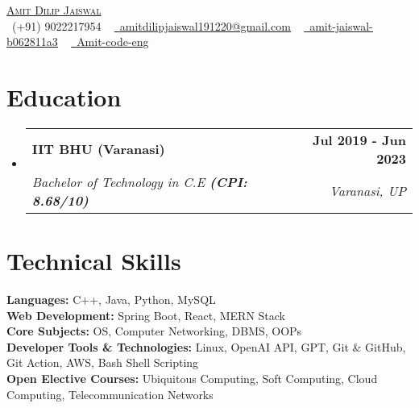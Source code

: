 \documentclass[letterpaper,11pt]{article}
\makeatletter
\newcommand{\resumeSubheading}[4]{
  \vspace{-2pt}\item
    \begin{tabular*}{1.0\textwidth}[t]{l@{\extracolsep{\fill}}r}
      \textbf{#1} & \textbf{\small #2} \\
      \textit{\small#3} & \textit{\small #4} \\
    \end{tabular*}\vspace{-7pt}
}
\newcommand{\resumeSubHeadingListStart}{\begin{itemize}[leftmargin=0.0in, label={}]}
\newcommand{\resumeSubHeadingListEnd}{\end{itemize}}
\makeatother
\begin{document}
\begin{center}
    {\Huge \scshape \href{https://amit-dilip-jaiswal.vercel.app/}{Amit Dilip Jaiswal}} \\ \vspace{3pt}
    \small \raisebox{-0.1\height}\faPhone\ {{(+91) 9022217954}} ~ \href{mailto:amitdilipjaiswal191220@gmail.com}{\raisebox{-0.2\height}\faEnvelope\  \underline{{amitdilipjaiswal191220@gmail.com}}} ~ 
    \href{https://www.linkedin.com/in/amit-jaiswal-b062811a3/}{\raisebox{-0.2\height}\faLinkedin\ \underline{{amit-jaiswal-b062811a3}}}  ~
    \href{https://github.com/Amit-code-eng}{\raisebox{-0.2\height}\faGithub\ \underline{{Amit-code-eng}}}
    \vspace{-10pt}
\end{center}





\section{Education}
\vspace{-2pt}
  \resumeSubHeadingListStart
    \resumeSubheading
      {IIT BHU (Varanasi)}{Jul 2019 - Jun 2023}
      {Bachelor of Technology in C.E \textbf{(CPI: 8.68/10)}}{Varanasi, UP}
      
  \resumeSubHeadingListEnd

 \vspace{-17pt}


\section{Technical Skills}
\vspace{-3pt}
 \begin{itemize}[leftmargin=0.15in, label={}]
    \small{\item{
    \textbf{Languages: }{C++, Java, Python, MySQL} \\
    \textbf{Web Development: }{Spring Boot, React, MERN Stack}\\
     \textbf{Core Subjects: }{OS, Computer Networking, DBMS, OOPs} \\
     \textbf{Developer Tools \& Technologies: }{Linux, OpenAI API, GPT, Git \& GitHub, Git Action, AWS, Bash Shell Scripting} \\
    \textbf{Open Elective Courses: }{Ubiquitous Computing, Soft Computing, Cloud Computing, Telecommunication Networks}\\
     
    }}\\
    
 \end{itemize}
 \vspace{-20pt}
\end{document}
